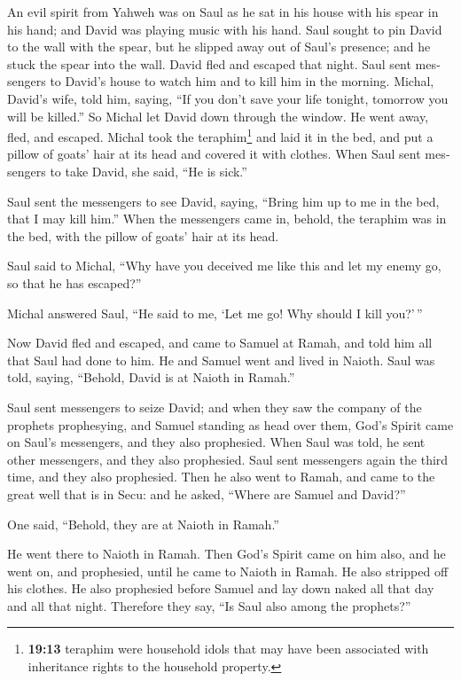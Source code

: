 \begin{paracol}{2}
\begin{otherlanguage}{english}
 An evil spirit from Yahweh was on Saul as he sat in his
house with his spear in his hand; and David was playing music with his
hand.  Saul sought to pin David to the wall with the
spear, but he slipped away out of Saul's presence; and he stuck the
spear into the wall. David fled and escaped that night. 
Saul sent messengers to David's house to watch him and to kill him in
the morning. Michal, David's wife, told him, saying, ``If you don't save
your life tonight, tomorrow you will be killed.''  So
Michal let David down through the window. He went away, fled, and
escaped.  Michal took the teraphim\footnote{\textbf{19:13}
  teraphim were household idols that may have been associated with
  inheritance rights to the household property.} and laid it in the bed,
and put a pillow of goats' hair at its head and covered it with clothes.
 When Saul sent messengers to take David, she said, ``He
is sick.''

 Saul sent the messengers to see David, saying, ``Bring
him up to me in the bed, that I may kill him.''  When the
messengers came in, behold, the teraphim was in the bed, with the pillow
of goats' hair at its head.

 Saul said to Michal, ``Why have you deceived me like
this and let my enemy go, so that he has escaped?''

Michal answered Saul, ``He said to me, `Let me go! Why should I kill
you?'\,''

 Now David fled and escaped, and came to Samuel at Ramah,
and told him all that Saul had done to him. He and Samuel went and lived
in Naioth.  Saul was told, saying, ``Behold, David is at
Naioth in Ramah.''

 Saul sent messengers to seize David; and when they saw
the company of the prophets prophesying, and Samuel standing as head
over them, God's Spirit came on Saul's messengers, and they also
prophesied.  When Saul was told, he sent other
messengers, and they also prophesied. Saul sent messengers again the
third time, and they also prophesied.  Then he also went
to Ramah, and came to the great well that is in Secu: and he asked,
``Where are Samuel and David?''

One said, ``Behold, they are at Naioth in Ramah.''

 He went there to Naioth in Ramah. Then God's Spirit came
on him also, and he went on, and prophesied, until he came to Naioth in
Ramah.  He also stripped off his clothes. He also
prophesied before Samuel and lay down naked all that day and all that
night. Therefore they say, ``Is Saul also among the prophets?''


\end{otherlanguage}
\end{paracol}
